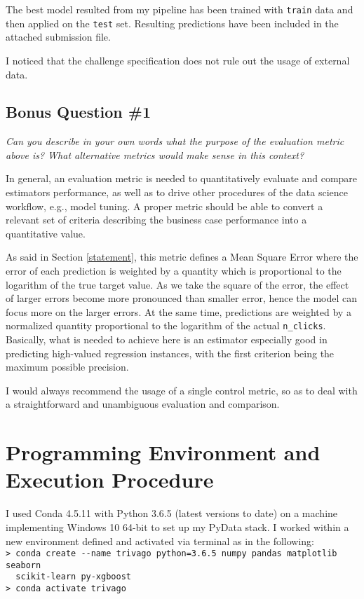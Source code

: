 \documentclass[preprint,12pt,3p]{elsarticle}
\begin{document}
The best model resulted from my pipeline has been trained with \verb|train| data and then applied on the \verb|test| set. Resulting predictions have been included in the attached submission file.

I noticed that the challenge specification does not rule out the usage of external data.

\subsection{Bonus Question \#1}
\label{bonus1}
\textit{Can you describe in your own words what the purpose of the evaluation metric above is? What alternative metrics would make sense in this context?}

In general, an evaluation metric is needed to quantitatively evaluate and compare estimators performance, as well as to drive other procedures of the data science workflow, e.g., model tuning. A proper metric should be able to convert a relevant set of criteria describing the business case performance into a quantitative value.

As said in Section \ref{statement}, this metric defines a Mean Square Error where the error of each prediction is weighted by a quantity which is proportional to the logarithm of the true target value. As we take the square of the error, the effect of larger errors become more pronounced than smaller error, hence the model can focus more on the larger errors. At the same time, predictions are weighted by a normalized quantity proportional to the logarithm of the actual \verb|n_clicks|. Basically, what is needed to achieve here is an estimator especially good in predicting high-valued regression instances, with the first criterion being the maximum possible precision.

I would always recommend the usage of a single control metric, so as to deal with a straightforward and unambiguous evaluation and comparison.

\section{Programming Environment and Execution Procedure}
I used Conda 4.5.11 with Python 3.6.5 (latest versions to date) on a machine implementing Windows 10 64-bit to set up my PyData stack. I worked within a new environment defined and activated via terminal as in the following:\\
\verb|> conda create --name trivago python=3.6.5 numpy pandas matplotlib seaborn|\\
\verb|  scikit-learn py-xgboost|\\
\verb|> conda activate trivago|
\end{document}
